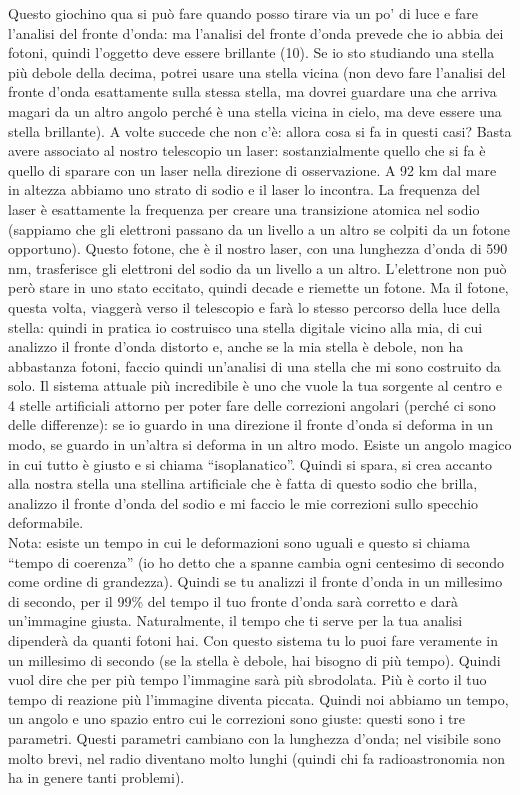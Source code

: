 \documentclass[a4paper,11pt]{article}
\begin{document}
Questo giochino qua si può fare quando posso tirare via un po’ di luce e fare l’analisi del fronte d’onda: ma l’analisi del fronte d’onda prevede che io abbia dei fotoni, quindi l’oggetto deve essere brillante (10). Se io sto studiando una stella più debole della decima, potrei usare una stella vicina (non devo fare l’analisi del fronte d’onda esattamente sulla stessa stella, ma dovrei guardare una che arriva magari da un altro angolo perché è una stella vicina in cielo, ma deve essere una stella brillante). A volte succede che non c’è: allora cosa si fa in questi casi? Basta avere associato al nostro telescopio un laser: sostanzialmente quello che si fa è quello di sparare con un laser nella direzione di osservazione. A 92 km dal mare in altezza abbiamo uno strato di sodio e il laser lo incontra. La frequenza del laser è esattamente la frequenza per creare una transizione atomica nel sodio (sappiamo che gli elettroni passano da un livello a un altro se colpiti da un fotone opportuno). Questo fotone, che è il nostro laser, con una lunghezza d’onda di 590 nm, trasferisce gli elettroni del sodio da un livello a un altro. L’elettrone non può però stare in uno stato eccitato, quindi decade e riemette un fotone. Ma il fotone, questa volta, viaggerà verso il telescopio e farà lo stesso percorso della luce della stella: quindi in pratica io costruisco una stella digitale vicino alla mia, di cui analizzo il fronte d’onda distorto e, anche se la mia stella è debole, non ha abbastanza fotoni, faccio quindi un’analisi di una stella che mi sono costruito da solo. Il sistema attuale più incredibile è uno che vuole la tua sorgente al centro e 4 stelle artificiali attorno per poter fare delle correzioni angolari (perché ci sono delle differenze): se io guardo in una direzione il fronte d’onda si deforma in un modo, se guardo in un’altra si deforma in un altro modo. Esiste un angolo magico in cui tutto è giusto e si chiama “isoplanatico”. Quindi si spara, si crea accanto alla nostra stella una stellina artificiale che è fatta di questo sodio che brilla, analizzo il fronte d’onda del sodio e mi faccio le mie correzioni sullo specchio deformabile.\\

Nota: esiste un tempo in cui le deformazioni sono uguali e questo si chiama “tempo di coerenza” (io ho detto che a spanne cambia ogni centesimo di secondo come ordine di grandezza). Quindi se tu analizzi il fronte d’onda in un millesimo di secondo, per il 99\% del tempo il tuo fronte d’onda sarà corretto e darà un’immagine giusta. Naturalmente, il tempo che ti serve per la tua analisi dipenderà da quanti fotoni hai. Con questo sistema tu lo puoi fare veramente in un millesimo di secondo (se la stella è debole, hai bisogno di più tempo). Quindi vuol dire che per più tempo l’immagine sarà più sbrodolata. Più è corto il tuo tempo di reazione più l’immagine diventa piccata. Quindi noi abbiamo un tempo, un angolo e uno spazio entro cui le correzioni sono giuste: questi sono i tre parametri. Questi parametri cambiano con la lunghezza d’onda; nel visibile sono molto brevi, nel radio diventano molto lunghi (quindi chi fa radioastronomia non ha in genere tanti problemi).\\
 
\end{document}
